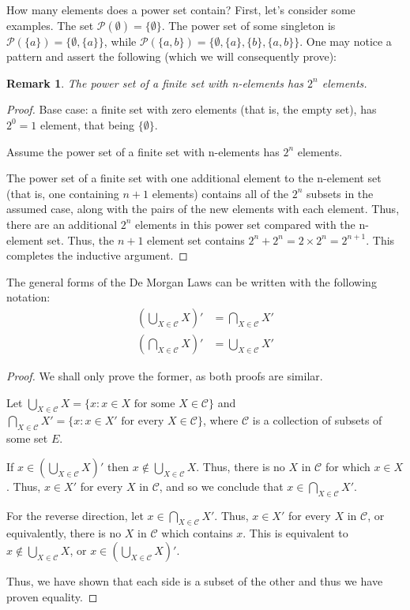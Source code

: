 \documentclass[12pt]{article}
\newtheorem{remark}{Remark}
\begin{document}
How many elements does a power set contain? First, let's consider some examples. The set $\mathcal{P}(\emptyset) = \{\emptyset\}$.
The power set of some singleton is $\mathcal{P}(\{a\}) = \{\emptyset, \{a\}\}$, while $\mathcal{P}(\{a, b\}) = \{\emptyset, \{a\}, \{b\}, \{a, b\}\}$.
One may notice a pattern and assert the following (which we will consequently prove):

\begin{remark}
    The power set of a finite set with n-elements has $2^n$ elements.
\end{remark}
\begin{proof}
    Base case: a finite set with zero elements (that is, the empty set), has $2^0 = 1$ element, that being
    $\{\emptyset\}$.

    Assume the power set of a finite set with n-elements has $2^n$ elements.

    The power set of a finite set with one additional element to the n-element set (that is, one containing $n + 1$ elements)
    contains all of the $2^n$ subsets in the assumed case, along with the pairs of the new elements with each element. Thus,
    there are an additional $2^n$ elements in this power set compared with the n-element set. Thus, the $n + 1$
    element set contains $2^n + 2^n = 2 \times 2^n = 2^{n + 1}$. This completes the inductive argument.
\end{proof}

The general forms of the De Morgan Laws can be written with the following notation:
\begin{align}
    \left(\bigcup_{X \in \mathcal{C}}X\right)' &= \bigcap_{X \in \mathcal{C}}X'\\
    \left(\bigcap_{X \in \mathcal{C}}X\right)' &= \bigcup_{X \in \mathcal{C}}X'
\end{align}
\begin{proof}
    We shall only prove the former, as both proofs are similar.

    Let $\bigcup_{X \in \mathcal{C}}X = \{x: x \in X \text{ for some } X \in \mathcal{C}\}$ and $\bigcap_{X \in \mathcal{C}}X'
    = \{x: x \in X' \text{ for every } X \in \mathcal{C}\}$, where $\mathcal{C}$ is a collection of subsets of
    some set $E$.

    If $x \in \left(\bigcup_{X \in \mathcal{C}}X\right)'$ then $x \notin \bigcup_{X \in \mathcal{C}}X$. Thus,
    there is no $X$ in $\mathcal{C}$ for which $x \in X$. Thus, $x \in X'$ for every $X$ in $\mathcal{C}$, and so
    we conclude that $x \in \bigcap_{X \in \mathcal{C}}X'$.

    For the reverse direction, let $x \in \bigcap_{X \in \mathcal{C}}X'$. Thus, $x \in X'$ for every
    $X$ in $\mathcal{C}$, or equivalently, there is no $X$ in $\mathcal{C}$ which contains $x$. This is
    equivalent to $x \notin \bigcup_{X \in \mathcal{C}}X$, or $x \in (\bigcup_{X \in \mathcal{C}}X)'$.

    Thus, we have shown that each side is a subset of the other and thus we have proven equality.
\end{proof}
\end{document}
